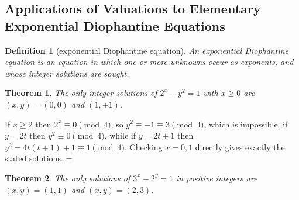 \documentclass[11pt]{article}
\makeatletter
\theoremstyle{ntstyle}
\newtheorem{theorem}{Theorem}[subsection]
\newtheorem{definition}{Definition}[subsection]
\let\nt@closedisplay\]
\def\nt@guardedclose{\@ifnextchar\par{\nt@closeafterpar}{\@ifnextchar\end{\postdisplaypenalty\@M\nt@closedisplay}{\nt@closedisplay}}}
\def\nt@closeafterpar\par{\@ifnextchar\par{\nt@closeafterpar}{\@ifnextchar\end{\postdisplaypenalty\@M\nt@closedisplay\par}{\nt@closedisplay\par}}}
\renewenvironment{proof}[1][\proofname]{\par
  \pushQED{\qed}\normalfont\topsep\medskipamount\edef\nt@afterproof{\@endparpenalty=\the\@endparpenalty\relax}\@beginparpenalty\@M\@endparpenalty\@M\let\]\nt@guardedclose\trivlist\item[]\textit{#1\@addpunct{.}} \ignorespaces}{\ifvmode\addpenalty\@M\fi\popQED\nt@afterproof\endtrivlist\@endpefalse}
\makeatother
\begin{document}
\subsection{Applications of Valuations to Elementary Exponential Diophantine Equations}

\begin{definition}[exponential Diophantine equation]\label{def:4.9.1}
	An exponential Diophantine equation is an equation in which one or more unknowns occur as
	exponents, and whose integer solutions are sought.
\end{definition}
\begin{theorem}\label{thm:4.9.1}
	The only integer solutions of $2^x-y^2=1$ with $x\ge0$ are $(x,y)=(0,0)$
	and $(1,\pm1)$.
\end{theorem}

\begin{proof} If $x\ge2$ then $2^{x}\equiv0\pmod{4}$, so
	$y^{2}\equiv-1\equiv3\pmod{4}$, which is impossible: if $y=2t$ then
	$y^2\equiv0\pmod{4}$, while if $y=2t+1$ then
	$y^2=4t(t+1)+1\equiv1\pmod{4}$. Checking $x=0,1$ directly gives exactly the stated
	solutions.
\end{proof}
\begin{theorem}\label{thm:4.9.2}
	The only solutions of $3^x-2^y=1$ in positive integers are $(x,y)=(1,1)$
	and $(x,y)=(2,3)$.
\end{theorem}
\end{document}
